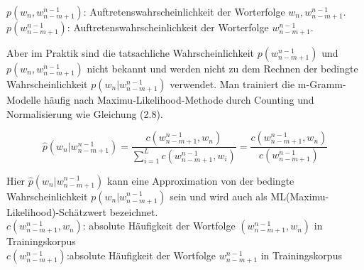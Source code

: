 $p(w_{n},w_{n-m+1}^{n-1})$: Auftretenswahrscheinlichkeit der Worterfolge $w_{n},w_{n-m+1}^{n-1}$.
$p(w_{n-m+1}^{n-1})$: Auftretenswahrscheinlichkeit der Worterfolge $w_{n-m+1}^{n-1}$.


Aber im Praktik sind die tatsachliche Wahrscheinlichkeit $p(w_{n-m+1}^{n-1})$  und $p(w_{n},w_{n-m+1}^{n-1})$ nicht bekannt und werden nicht zu dem Rechnen der bedingte Wahrscheinlichkeit $p(w_{n}|w_{n-m+1}^{n-1})$ verwendet. Man trainiert die m-Gramm-Modelle h\"aufig nach Maximu-Likelihood-Methode \cite{int_MLE} durch Counting und Normalisierung wie Gleichung (2.8). 

\begin{equation}
\hat{p}(w_{n}|w_{n-m+1}^{n-1})=\frac{c(w_{n-m+1}^{n-1},w_{n} )}{ \sum_{i=1}^L c(w_{n-m+1}^{n-1},w_{i})}=\frac{c(w_{n-m+1}^{n-1},w_{n} )}{c(w_{n-m+1}^{n-1})}
\end{equation}

Hier $\hat{p}(w_{n}|w_{n-m+1}^{n-1})$ kann eine Approximation von der bedingte Wahrscheinlichkeit $p(w_{n}|w_{n-m+1}^{n-1})$ sein und wird auch als ML(Maximu-Likelihood)-Sch\"atzwert bezeichnet.\\
$c(w_{n-m+1}^{n-1},w_{n})$: absolute H\"aufigkeit der Wortfolge $(w_{n-m+1}^{n-1},w_{n})$ in Trainingskorpus\\
$c(w_{n-m+1}^{n-1})$:absolute H\"aufigkeit der Wortfolge $w_{n-m+1}^{n-1}$ in Trainingskorpus\\

\cite{ars_script}
\cite{int_MLE}
\cite{folie_script}
\cite{int_entropie}
